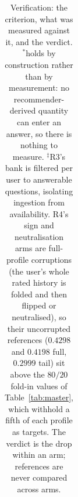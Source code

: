 \documentclass[acmsmall,review,anonymous]{acmart}
\begin{document}
\begin{table}[t]
\begin{tabular}{p{1.7cm}p{3.7cm}p{6.0cm}p{1.2cm}}
\bottomrule
\end{tabular}
\caption{Verification: the criterion, what was measured against it, and the verdict. $^{*}$holds by construction rather than by measurement: no recommender-derived quantity can enter an answer, so there is nothing to measure. $^\ddagger$R3's bank is filtered per user to answerable questions, isolating ingestion from availability. R4's sign and neutralisation arms are full-profile corruptions (the user's whole rated history is folded and then flipped or neutralised), so their uncorrupted references ($0.4298$ and $0.4198$ full, $0.2999$ tail) sit above the $80/20$ fold-in values of Table~\ref{tab:master}, which withhold a fifth of each profile as targets. The verdict is the drop within an arm; references are never compared across arms.}
\label{tab:battery}
\end{table}
\end{document}
